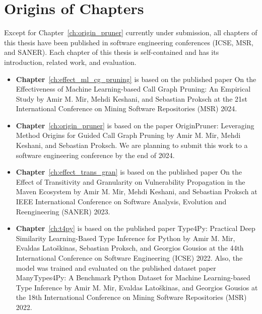 

\section{Origins of Chapters}
Except for Chapter~\ref{ch:origin_pruner} currently under submission, all chapters of this thesis have been published in software engineering conferences (ICSE, MSR, and SANER). Each chapter of this thesis is self-contained and has its introduction, related work, and evaluation.

\begin{itemize}
    \item \textbf{Chapter}~\ref{ch:effect_ml_cg_pruning} is based on the published paper On the Effectiveness of Machine Learning-based Call Graph Pruning: An Empirical Study by Amir M. Mir, Mehdi Keshani, and Sebastian Proksch at the 21st International Conference on Mining Software Repositories (MSR) 2024.

    \item \textbf{Chapter}~\ref{ch:origin_pruner} is based on the paper OriginPruner: Leveraging Method Origins for Guided Call Graph Pruning by Amir M. Mir, Mehdi Keshani, and Sebastian Proksch. We are planning to submit this work to a software engineering conference by the end of 2024.

    \item \textbf{Chapter}~\ref{ch:effect_trans_gran} is based on the published paper On the Effect of Transitivity and Granularity on Vulnerability Propagation in the Maven Ecosystem by Amir M. Mir, Mehdi Keshani, and Sebastian Proksch at IEEE International
Conference on Software Analysis, Evolution and Reengineering (SANER) 2023.

    \item \textbf{Chapter}~\ref{ch:t4py} is based on the published paper Type4Py: Practical Deep Similarity Learning-Based Type Inference for Python by Amir M. Mir, Evaldas Latoškinas, Sebastian Proksch, and Georgios Gousios at the 44th International Conference on Software Engineering (ICSE) 2022. Also, the  model was trained and evaluated on the published dataset paper ManyTypes4Py: A Benchmark Python Dataset for Machine Learning-based Type Inference by Amir M. Mir, Evaldas Latoškinas, and Georgios Gousios at the 18th International Conference on Mining Software Repositories (MSR) 2022.
\end{itemize}

